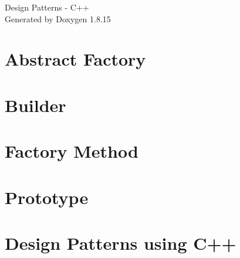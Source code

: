 \let\mypdfximage\pdfximage\def\pdfximage{\immediate\mypdfximage}\documentclass[twoside]{book}
\newcommand{\+}{\discretionary{\mbox{\scriptsize$\hookleftarrow$}}{}{}}
\newcommand{\clearemptydoublepage}{%
  \newpage{\pagestyle{empty}\cleardoublepage}%
}
\begin{document}
\hypersetup{pageanchor=false,
             bookmarksnumbered=true,
             pdfencoding=unicode
            }
\begin{titlepage}
\vspace*{7cm}
\begin{center}%
{\Large Design Patterns -\/ C++ }\\
\vspace*{1cm}
{\large Generated by Doxygen 1.8.15}\\
\end{center}
\end{titlepage}
\clearemptydoublepage
{}
\tableofcontents
\clearemptydoublepage
{}
\hypersetup{pageanchor=true}

\chapter{Abstract Factory}
\label{md__d_1__g_i_t__practice__design_patterns__abstract_factory__r_e_a_d_m_e}

\chapter{Builder}
\label{md__d_1__g_i_t__practice__design_patterns__builder__r_e_a_d_m_e}

\chapter{Factory Method}
\label{md__d_1__g_i_t__practice__design_patterns__factory_method__r_e_a_d_m_e}

\chapter{Prototype}
\label{md__d_1__g_i_t__practice__design_patterns__prototype__r_e_a_d_m_e}

\chapter{Design Patterns using C++}
\label{md__d_1__g_i_t__practice__design_patterns__r_e_a_d_m_e}

\end{document}
